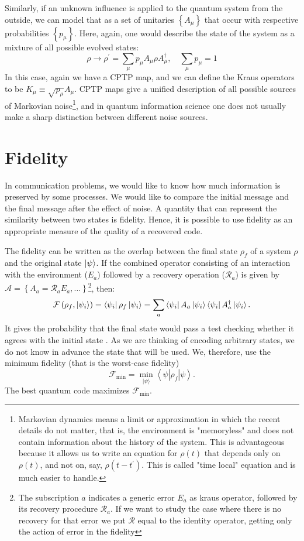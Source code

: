 Similarly, if an unknown influence is applied to the quantum system from the outside, we can model that as a set of unitaries $\left\{A_{\mu}\right\}$ that occur with respective probabilities $\left\{p_{\mu}\right\}$. Here, again, one would describe the state of the system as a mixture of all possible evolved states:
$$
\rho \rightarrow \rho^{\prime}=\sum_{\mu} p_{\mu} A_{\mu} \rho A_{\mu}^{\dagger}, \quad \sum_{\mu} p_{\mu}=1
$$
In this case, again we have a CPTP map, and we can define the Kraus operators to be $K_{\mu} \equiv \sqrt{p_{\mu}} A_{\mu} .$ 
CPTP maps give a unified description of all possible sources of Markovian noise\footnote{ Markovian dynamics means a limit or approximation in which the recent details do not matter, that is, the environment is "memoryless" and does not contain information about the history of the system. This is advantageous because it allows us to write an equation for $\rho(t)$ that depends only on $\rho(t)$, and not on, say, $\rho\left(t-t^{\prime}\right)$. This is called "time local" equation and is much easier to handle.}, and in quantum information science one does not usually make a sharp distinction between different noise sources. 




\section{Fidelity}
In communication problems, we would like to know how much information is preserved by some processes. We would like to compare the initial message and the final message after the effect of noise. 
A quantity that can represent the similarity between two states is fidelity. 
Hence, it is possible to use fidelity as an appropriate measure of the quality of a recovered code.

The fidelity can be written as the overlap between the final state $\rho_f$ of a system $\rho$ and the original state $\ket{\psi}$.
If the combined operator consisting of an interaction with the environment ($E_a$) followed by a recovery operation ($\mathcal{R}_a$) is given by $\mathcal{A}=\left\{A_{a}=\mathcal{R}_aE_a, \ldots\right\}$\footnote{The subscription $a$ indicates a generic error $E_a$ as kraus operator, followed by its recovery procedure $\mathcal{R}_a$. If we want to study the case where there is no recovery for that error we put $\mathcal{R}$ equal to the identity operator, getting only the action of error in the fidelity}, then:
$$
\mathcal{F}\left(\rho_f,\ket{\psi_i}\right)=\bra{\psi_i}\rho_{f}\ket{\psi_i}=\sum_{a}\bra{\psi_i}A_{a}\ket{\psi_i}\bra{\psi_i}A_{a}^{\dagger}\ket{\psi_i} .
$$
It gives the probability that the final state would pass a test checking whether it agrees with the initial state \cite{Knill_2000}. As we are thinking of encoding arbitrary states, we do not know in advance the state that will be used. We, therefore, use the minimum fidelity (that is the worst-case fidelity)
\begin{equation}
\mathcal{F}_{\min }=\min _{|\psi\rangle}\left\langle\psi\left|\rho_{f}\right| \psi\right\rangle .
\end{equation}
The best quantum code maximizes $\mathcal{F}_{\min }$. 


